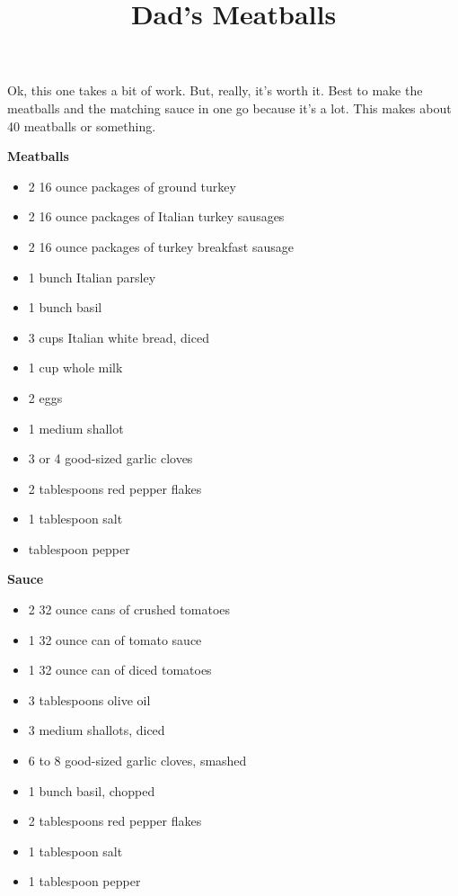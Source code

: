 \documentclass{article}
\title{Dad's Meatballs}
\begin{document}
Ok, this one takes a bit of work. But, really, it's worth it. Best to make the meatballs and the matching sauce in one
go because it's a lot. This makes about 40 meatballs or something.

\begin{multicols}{2}

      \textbf{Meatballs}
      \begin{itemize}
            \item 2 16 ounce packages of ground turkey
            \item 2 16 ounce packages of Italian turkey sausages
            \item 2 16 ounce packages of turkey breakfast sausage
            \item 1 bunch Italian parsley
            \item 1 bunch basil
            \item 3 cups Italian white bread, diced
            \item 1 cup whole milk
            \item 2 eggs
            \item 1 medium shallot
            \item 3 or 4 good-sized garlic cloves
            \item 2 tablespoons red pepper flakes
            \item 1 tablespoon salt
            \item {} tablespoon pepper
      \end{itemize}

      \columnbreak

      \textbf{Sauce}
      \begin{itemize}
            \item 2 32 ounce cans of crushed tomatoes
            \item 1 32 ounce can of tomato sauce
            \item 1 32 ounce can of diced tomatoes
            \item 3 tablespoons olive oil
            \item 3 medium shallots, diced
            \item 6 to 8 good-sized garlic cloves, smashed
            \item 1 bunch basil, chopped
            \item 2 tablespoons red pepper flakes
            \item 1 tablespoon salt
            \item 1 tablespoon pepper
      \end{itemize}

\end{multicols}
\end{document}

